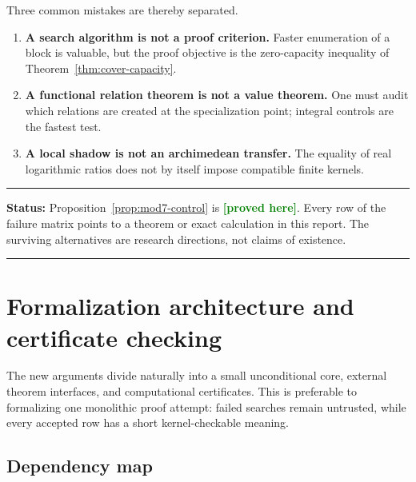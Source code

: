 \documentclass[11pt,oneside]{article}
\theoremstyle{definition}
\theoremstyle{remark}
\newcommand{\statusproved}{\textcolor{green}{\textbf{[proved here]}}}
\newenvironment{statusbox}[1]
{\begin{center}\begin{minipage}{0.95\textwidth}\raggedright\hrule
\vspace{0.45em}\textbf{Status:} #1\par\vspace{0.35em}}
{\vspace{0.35em}\hrule\end{minipage}\end{center}}
\begin{document}
Three common mistakes are thereby separated.

\begin{enumerate}
\item \textbf{A search algorithm is not a proof criterion.}  Faster enumeration of a block is
valuable, but the proof objective is the zero-capacity inequality of
Theorem~\ref{thm:cover-capacity}.
\item \textbf{A functional relation theorem is not a value theorem.}  One must audit which
relations are created at the specialization point; integral controls are the fastest test.
\item \textbf{A local shadow is not an archimedean transfer.}  The equality of real logarithmic
ratios does not by itself impose compatible finite kernels.
\end{enumerate}

\begin{statusbox}{Proposition~\ref{prop:mod7-control} is \statusproved.  Every row of the failure
matrix points to a theorem or exact calculation in this report.  The surviving alternatives are
research directions, not claims of existence.}
\end{statusbox}

\section{Formalization architecture and certificate checking}
\label{sec:formalization}

The new arguments divide naturally into a small unconditional core, external theorem interfaces,
and computational certificates.  This is preferable to formalizing one monolithic proof attempt:
failed searches remain untrusted, while every accepted row has a short kernel-checkable meaning.

\subsection{Dependency map}
\end{document}
